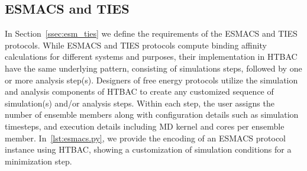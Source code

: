 \subsection{ESMACS and TIES} 


In Section~\ref{ssec:esm_ties} we define the requirements of the ESMACS and 
TIES protocols. While ESMACS and TIES protocols compute binding affinity 
calculations for different systems and purposes, their implementation in HTBAC 
have the same underlying pattern, consisting of simulations steps, followed by 
one or more analysis step(s). 
Designers of free energy protocols utilize the simulation and analysis 
components of HTBAC to create any customized sequence of simulation(s) and/or
analysis steps. Within each step, the user assigns the number of ensemble 
members along with configuration details such as simulation timesteps, and 
execution details including MD kernel and cores per ensemble member. 
In~\ref{lst:esmacs.py}, we provide the 
encoding of an ESMACS protocol instance using HTBAC, showing a customization of 
simulation conditions for a minimization step. 






